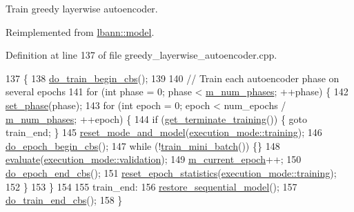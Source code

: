 Train greedy layerwise autoencoder. 

Reimplemented from \hyperlink{classlbann_1_1model_a11c79dc3783d11b799bdc40ff9c92ddc}{lbann\+::model}.



Definition at line 137 of file greedy\+\_\+layerwise\+\_\+autoencoder.\+cpp.


\begin{DoxyCode}
137                                                        \{
138   \hyperlink{classlbann_1_1model_a780395fa740102adda5537aa5d257698}{do\_train\_begin\_cbs}();
139 
140   \textcolor{comment}{// Train each autoencoder phase on several epochs}
141   \textcolor{keywordflow}{for} (\textcolor{keywordtype}{int} phase = 0; phase < \hyperlink{classlbann_1_1greedy__layerwise__autoencoder_a792010a00136ee1e024b6e5d38c77386}{m\_num\_phases}; ++phase) \{
142     \hyperlink{classlbann_1_1greedy__layerwise__autoencoder_a5f237f1f6285475c5493a7d15dc32096}{set\_phase}(phase);
143     \textcolor{keywordflow}{for} (\textcolor{keywordtype}{int} epoch = 0; epoch < num\_epochs / \hyperlink{classlbann_1_1greedy__layerwise__autoencoder_a792010a00136ee1e024b6e5d38c77386}{m\_num\_phases}; ++epoch) \{
144       \textcolor{keywordflow}{if} (\hyperlink{classlbann_1_1model_a90363b6a20269cf7197701e49f1f52a3}{get\_terminate\_training}()) \{ \textcolor{keywordflow}{goto} train\_end; \}
145       \hyperlink{classlbann_1_1model_a5d188d75f53e0a4c6161500181b27c03}{reset\_mode\_and\_model}(\hyperlink{base_8hpp_a2781a159088df64ed7d47cc91c4dc0a8ac185ddac8b5a8f5aa23c5b80bc12d214}{execution\_mode::training});
146       \hyperlink{classlbann_1_1model_a6f975af3ff4921d78a9eb1aca12eaf5e}{do\_epoch\_begin\_cbs}();
147       \textcolor{keywordflow}{while} (!\hyperlink{classlbann_1_1model_a462105993a63277a1ead39c30ebae1bb}{train\_mini\_batch}()) \{\}
148       \hyperlink{classlbann_1_1model_a4191097fdbcd1686525e9cd150f958ef}{evaluate}(\hyperlink{base_8hpp_a2781a159088df64ed7d47cc91c4dc0a8aa617908b172c473cb8e8cda059e55bf0}{execution\_mode::validation});
149       \hyperlink{classlbann_1_1model_a305fac94b9063e59198c7f936923221a}{m\_current\_epoch}++;
150       \hyperlink{classlbann_1_1model_a93e43a6c5aaf8ad890ef50ff97dfa176}{do\_epoch\_end\_cbs}();
151       \hyperlink{classlbann_1_1model_a9c6e9c199ca0ae06b8cf7266971ab9c3}{reset\_epoch\_statistics}(\hyperlink{base_8hpp_a2781a159088df64ed7d47cc91c4dc0a8ac185ddac8b5a8f5aa23c5b80bc12d214}{execution\_mode::training});
152     \}
153   \}
154 
155  train\_end:
156   \hyperlink{classlbann_1_1greedy__layerwise__autoencoder_a82b8ced756904a2423a65cd0e329b4e2}{restore\_sequential\_model}();
157   \hyperlink{classlbann_1_1model_a13bb6edae42c719b78454a8af9549122}{do\_train\_end\_cbs}();
158 \}
\end{DoxyCode}
